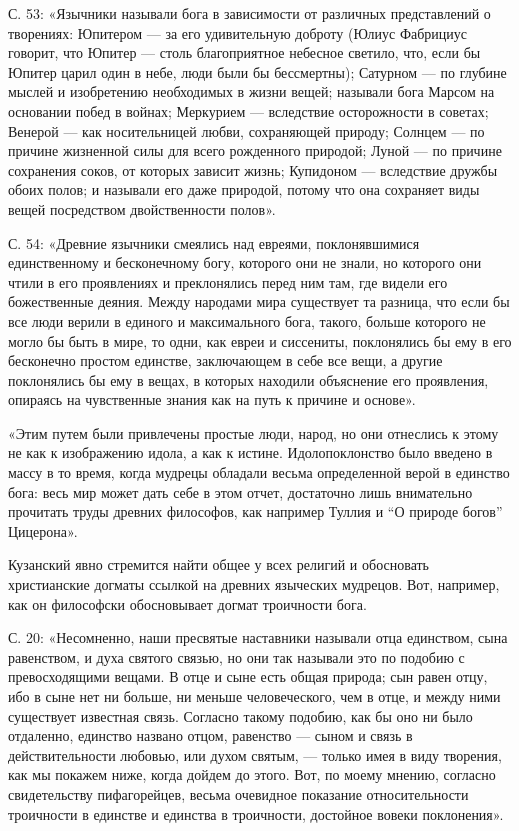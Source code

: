 С.   53:  «Язычники   называли   бога  в   зависимости  от   различных
представлений о  творениях: Юпитером  --- за его  удивительную доброту
(Юлиус Фабрициус говорит, что  Юпитер --- столь благоприятное небесное
светило,  что,  если  бы  Юпитер  царил один  в  небе,  люди  были  бы
бессмертны); Сатурном --- по  глубине мыслей и изобретению необходимых
в  жизни вещей;  называли бога  Марсом  на основании  побед в  войнах;
Меркурием  ---  вследствие осторожности  в  советах;  Венерой ---  как
носительницей  любви,  сохраняющей  природу; Солнцем  ---  по  причине
жизненной силы  для всего  рожденного природой;  Луной ---  по причине
сохранения соков,  от которых зависит жизнь;  Купидоном --- вследствие
дружбы  обоих полов;  и называли  его  даже природой,  потому что  она
сохраняет виды вещей посредством двойственности полов».

С.  54:   «Древние  язычники  смеялись  над   евреями,  поклонявшимися
единственному и бесконечному богу, которого  они не знали, но которого
они чтили в  его проявлениях и преклонялись перед ним  там, где видели
его божественные  деяния. Между  народами мира существует  та разница,
что если  бы все люди верили  в единого и максимального  бога, такого,
больше  которого  не могло  бы  быть  в мире,  то  одни,  как евреи  и
сиссениты,  поклонялись  бы ему  в  его  бесконечно простом  единстве,
заключающем в  себе все вещи, а  другие поклонялись бы ему  в вещах, в
которых находили  объяснение его  проявления, опираясь  на чувственные
знания как на путь к причине и основе».

«Этим путем  были привлечены простые  люди, народ, но они  отнеслись к
этому не как к изображению идола, а как к истине. Идолопоклонство было
введено в массу в то время, когда мудрецы обладали весьма определенной
верой  в  единство бога:  весь  мир  может  дать  себе в  этом  отчет,
достаточно  лишь внимательно  прочитать труды  древних философов,  как
например Туллия и ``О природе богов'' Цицерона».

Кузанский  явно стремится  найти  общее у  всех  религий и  обосновать
христианские  догматы  ссылкой  на древних  языческих  мудрецов.  Вот,
например, как он философски обосновывает догмат троичности бога.

С. 20: «Несомненно, наши пресвятые наставники называли отца единством,
сына равенством,  и духа святого  связью, но  они так называли  это по
подобию с превосходящими вещами. В отце и сыне есть общая природа; сын
равен отцу, ибо  в сыне нет ни больше, ни  меньше человеческого, чем в
отце,  и  между  ними  существует  известная  связь.  Согласно  такому
подобию,  как  бы  оно  ни было  отдаленно,  единство  названо  отцом,
равенство  --- сыном  и связь  в действительности  любовью, или  духом
святым,  ---  только  имея  в  виду творения,  как  мы  покажем  ниже,
когда дойдем  до этого. Вот,  по моему мнению,  согласно свидетельству
пифагорейцев, весьма очевидное  показание относительности троичности в
единстве и единства в троичности, достойное вовеки поклонения».

